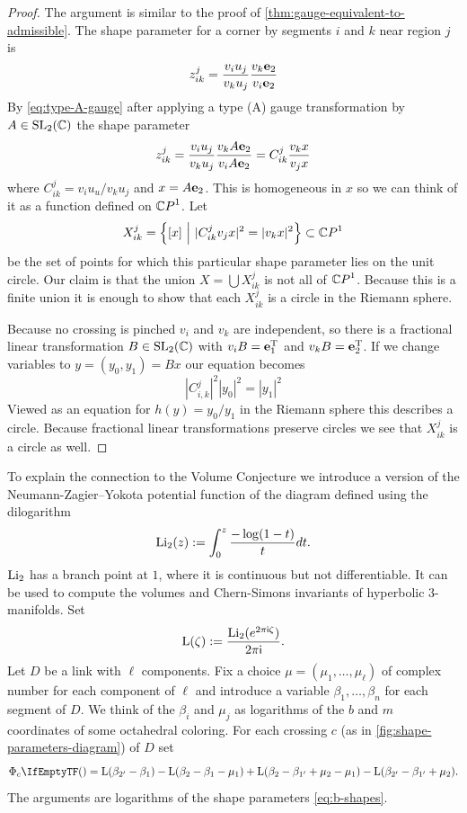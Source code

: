 \documentclass[leqno]{sl2art}
\begin{document}
\begin{proof}
  The argument is similar to the proof of \cref{thm:gauge-equivalent-to-admissible}.
  The shape parameter for a corner by segments \(i\) and \(k\) near region \(j\) is
  \[
    z_{ik}^{j} =
    \frac{
      v_i u_j
      }{
      v_k u_j
    }
    \frac{
      v_k \mathrm{\mathbf{e}}_{2}
      }{
      v_i \mathrm{\mathbf{e}}_{2}
    }
  \]
  By \cref{eq:type-A-gauge} after applying a type (A) gauge transformation by \(A \in \operatorname{SL}_2(\mathbb{C})\) the shape parameter
  \[
    z_{ik}^{j} =
    \frac{
      v_i u_j
      }{
      v_k u_j
    }
    \frac{
      v_k A \mathrm{\mathbf{e}}_{2}
      }{
      v_i A \mathrm{\mathbf{e}}_{2}
    }
    =
    C_{ik}^{j}
    \frac{
      v_k x
      }{
      v_j x
    }
  \]
  where \(C_{ik}^j = v_i u_u / v_k u_j\) and \(x = A \mathrm{\mathbf{e}}_{2}\).
  This is homogeneous in \(x\) so we can think of it as a function defined on \(\psp\).
  Let
  \[
    X_{i k}^j = 
    \set{ [x]  \given |C_{ik}^{j} v_j x|^2 = |v_k x|^2 } \subset \psp
  \]
  be the set of points for which this particular shape parameter lies on the unit circle.
  Our claim is that the union \(X = \bigcup X_{ik}^{j}\) is not all of \(\psp\).
  Because this is a finite union it is enough to show that each \(X_{ik}^{j}\) is a circle in the Riemann sphere.
  
  Because no crossing is pinched \(v_i\) and \(v_k\) are independent, so there is a fractional linear transformation \(B \in \operatorname{SL}_2(\mathbb{C})\) with \(v_i B = \mathrm{\mathbf{e}}_{1}^{\mathrm{T}}\) and  \(v_k B = \mathrm{\mathbf{e}}_{2}^{\mathrm{T}}\).
  If we change variables to \(y = (y_0, y_1) = B x\) our equation becomes
   \[
    |C_{i,k}^{j}|^2 |y_0|^2 = |y_1|^2
  \]
  Viewed as an equation for \(h(y) = y_0/y_1 \) in the Riemann sphere this describes a circle.
  Because fractional linear transformations preserve circles we see that \(X_{ik}^{j}\) is a circle as well.
\end{proof} 

To explain the connection to the Volume Conjecture we introduce a version of the Neumann-Zagier--Yokota potential function of the diagram defined using the dilogarithm
\[
  \operatorname{Li_2}(z)
  \mathrel{:=}
  \int_{0}^{z}
  \frac{
    - \log(1-t)
    }{
    t
  }
  dt
  .
\]
\(\operatorname{Li_2}\) has a branch point at \(1\), where it is continuous but not differentiable.
It can be used to compute the volumes \cite{Zagier2007} and Chern-Simons invariants \cite{Neumann2004} of hyperbolic \(3\)-manifolds.
Set
\begin{equation}
  \operatorname{L}(\zeta)
  \mathrel{:=}
  \frac{
    \operatorname{Li_2}(e^{2\pi \mathsf{i} \zeta})
    }{
    2\pi \mathsf{i}
  }
  .
\end{equation}
Let \(D\) be a link with \(\ell\) components.
Fix a choice \(\mu = (\mu_1, \dots, \mu_\ell) \) of complex number for each component of \(\ell\) and introduce a variable \(\beta_1, \dots, \beta_n\) for each segment of \(D\).
We think of the \(\beta_i\) and \(\mu_j\) as logarithms of the \(b\) and \(m\) coordinates of some octahedral coloring.
For each crossing \(c\) (as in \cref{fig:shape-parameters-diagram}) of \(D\) set
\[
  \potl[c]{} =
  \logdil(\beta_{2'} - \beta_{1})
  -\logdil(\beta_2 - \beta_1 - \mu_1)
  +\logdil(\beta_{2} - \beta_{1'} + \mu_2 - \mu_1)
  -\logdil(\beta_{2'} - \beta_{1'} + \mu_2)
  .
\]
The arguments are logarithms of the shape parameters \eqref{eq:b-shapes}.
\end{document}
